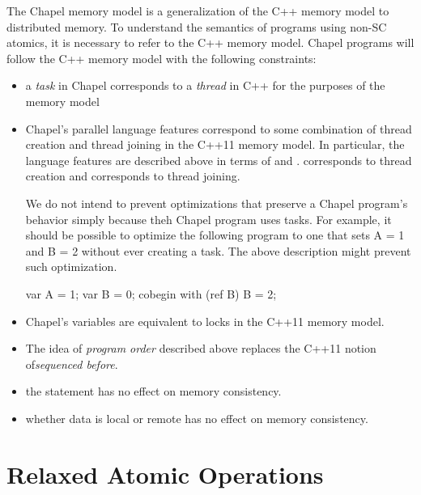 The Chapel memory model is a generalization of the C++ memory model to
distributed memory. To understand the semantics of programs using non-SC
atomics, it is necessary to refer to the C++ memory model. Chapel programs
will follow the C++ memory model with the following constraints:
\begin{itemize}
  \item a \textit{task} in Chapel corresponds to a \textit{thread} in C++
  for the purposes of the memory model

  \item Chapel's parallel language features correspond to some combination of
  thread creation and thread joining in the C++11 memory model. In particular,
  the language features are described above in terms of  and
  .  corresponds to thread creation and 
  corresponds to thread joining.

\begin{openissue}
  We do not intend to prevent optimizations that preserve a Chapel
  program's behavior simply because theh Chapel program uses tasks.
  For example, it should be possible to optimize the following program
  to one that sets A = 1 and B = 2 without ever creating a task. The
  above description might prevent such optimization.

\begin{chapel}
var A = 1;
var B = 0;
cobegin with (ref B) {
  B = 2;
}
\end{chapel}

\end{openissue}

  \item Chapel's  variables are equivalent to locks in the
  C++11 memory model.

  \item The idea of \textit{program order} described above replaces the
  C++11 notion of\textit{sequenced before}.

  \item the  statement has no effect on memory consistency.

  \item whether data is local or remote has no effect on memory consistency.

\end{itemize}

\section{Relaxed Atomic Operations}
\label{relaxed_atomics}

